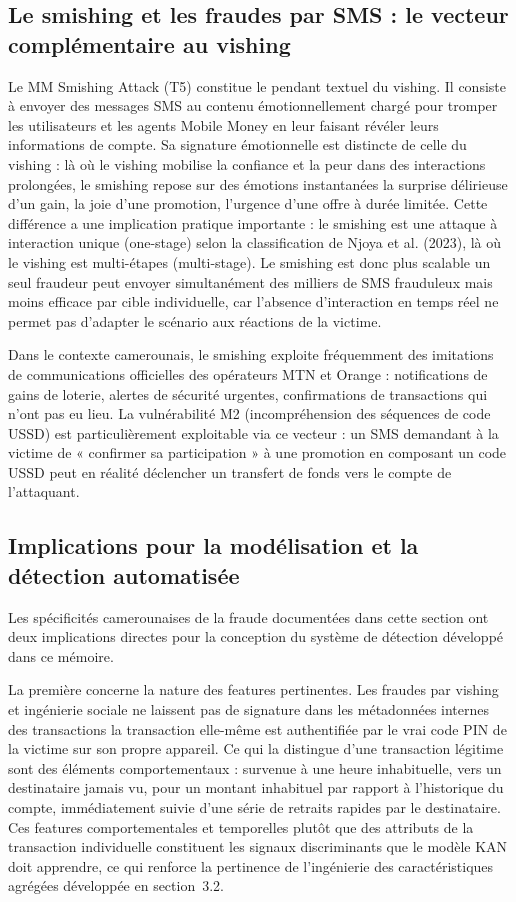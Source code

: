 \documentclass[11pt,a4paper,oneside]{report}
\theoremstyle{definition}
\theoremstyle{remark}
\begin{document}
\subsection{Le smishing et les fraudes par SMS : le vecteur complémentaire au vishing}

Le MM Smishing Attack (T5) constitue le pendant textuel du vishing. Il consiste à envoyer des messages SMS au contenu émotionnellement chargé pour tromper les utilisateurs et les agents Mobile Money en leur faisant révéler leurs informations de compte. Sa signature émotionnelle est distincte de celle du vishing : là où le vishing mobilise la confiance et la peur dans des interactions prolongées, le smishing repose sur des émotions instantanées  la surprise délirieuse d'un gain, la joie d'une promotion, l'urgence d'une offre à durée limitée. Cette différence a une implication pratique importante : le smishing est une attaque à interaction unique (one-stage) selon la classification de Njoya et al. (2023), là où le vishing est multi-étapes (multi-stage). Le smishing est donc plus scalable  un seul fraudeur peut envoyer simultanément des milliers de SMS frauduleux  mais moins efficace par cible individuelle, car l'absence d'interaction en temps réel ne permet pas d'adapter le scénario aux réactions de la victime.

Dans le contexte camerounais, le smishing exploite fréquemment des imitations de communications officielles des opérateurs MTN et Orange : notifications de gains de loterie, alertes de sécurité urgentes, confirmations de transactions qui n'ont pas eu lieu. La vulnérabilité M2 (incompréhension des séquences de code USSD) est particulièrement exploitable via ce vecteur : un SMS demandant à la victime de « confirmer sa participation » à une promotion en composant un code USSD peut en réalité déclencher un transfert de fonds vers le compte de l'attaquant.

\subsection{Implications pour la modélisation et la détection automatisée}

Les spécificités camerounaises de la fraude documentées dans cette section ont deux implications directes pour la conception du système de détection développé dans ce mémoire.

La première concerne la nature des features pertinentes. Les fraudes par vishing et ingénierie sociale ne laissent pas de signature dans les métadonnées internes des transactions  la transaction elle-même est authentifiée par le vrai code PIN de la victime sur son propre appareil. Ce qui la distingue d'une transaction légitime sont des éléments comportementaux : survenue à une heure inhabituelle, vers un destinataire jamais vu, pour un montant inhabituel par rapport à l'historique du compte, immédiatement suivie d'une série de retraits rapides par le destinataire. Ces features comportementales et temporelles  plutôt que des attributs de la transaction individuelle  constituent les signaux discriminants que le modèle KAN doit apprendre, ce qui renforce la pertinence de l'ingénierie des caractéristiques agrégées développée en section~3.2.
\end{document}
